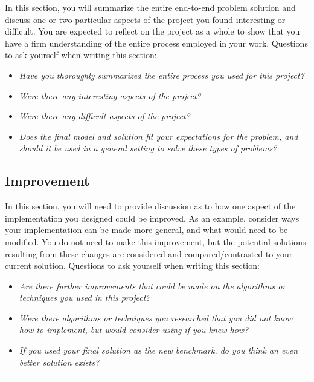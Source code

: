 \documentclass{article}
\begin{document}
In this section, you will summarize the entire end-to-end problem
solution and discuss one or two particular aspects of the project you
found interesting or difficult. You are expected to reflect on the
project as a whole to show that you have a firm understanding of the
entire process employed in your work. Questions to ask yourself when
writing this section:

\begin{itemize}
\item
  \emph{Have you thoroughly summarized the entire process you used for
  this project?}
\item
  \emph{Were there any interesting aspects of the project?}
\item
  \emph{Were there any difficult aspects of the project?}
\item
  \emph{Does the final model and solution fit your expectations for the
  problem, and should it be used in a general setting to solve these
  types of problems?}
\end{itemize}

\subsection{Improvement}\label{improvement}

In this section, you will need to provide discussion as to how one
aspect of the implementation you designed could be improved. As an
example, consider ways your implementation can be made more general, and
what would need to be modified. You do not need to make this
improvement, but the potential solutions resulting from these changes
are considered and compared/contrasted to your current solution.
Questions to ask yourself when writing this section:

\begin{itemize}
\item
  \emph{Are there further improvements that could be made on the
  algorithms or techniques you used in this project?}
\item
  \emph{Were there algorithms or techniques you researched that you did
  not know how to implement, but would consider using if you knew how?}
\item
  \emph{If you used your final solution as the new benchmark, do you
  think an even better solution exists?}
\end{itemize}

\begin{center}\rule{0.5\linewidth}{\linethickness}\end{center}
\end{document}
